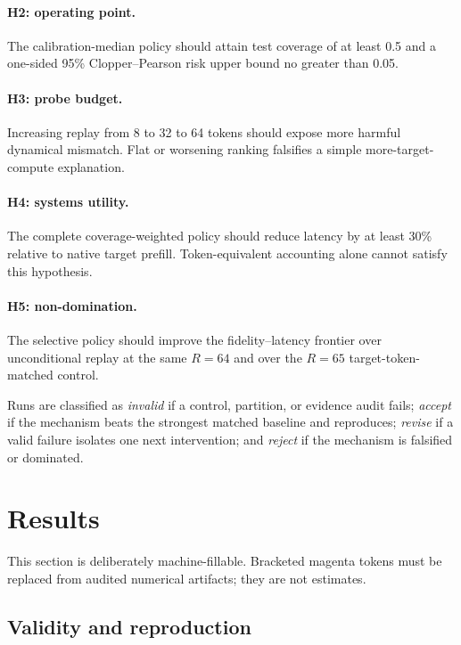 \documentclass[10pt,twocolumn]{article}
\begin{document}
\paragraph{H2: operating point.}
The calibration-median policy should attain test coverage of at least 0.5 and
a one-sided 95\% Clopper--Pearson risk upper bound no greater than 0.05.

\paragraph{H3: probe budget.}
Increasing replay from 8 to 32 to 64 tokens should expose more harmful
dynamical mismatch.  Flat or worsening ranking falsifies a simple
more-target-compute explanation.

\paragraph{H4: systems utility.}
The complete coverage-weighted policy should reduce latency by at least 30\%
relative to native target prefill.  Token-equivalent accounting alone cannot
satisfy this hypothesis.

\paragraph{H5: non-domination.}
The selective policy should improve the fidelity--latency frontier over
unconditional replay at the same $R=64$ and over the $R=65$
target-token-matched control.

Runs are classified as \emph{invalid} if a control, partition, or evidence
audit fails; \emph{accept} if the mechanism beats the strongest matched
baseline and reproduces; \emph{revise} if a valid failure isolates one next
intervention; and \emph{reject} if the mechanism is falsified or dominated.

\section{Results}

This section is deliberately machine-fillable.  Bracketed magenta tokens must
be replaced from audited numerical artifacts; they are not estimates.

\subsection{Validity and reproduction}
\end{document}

